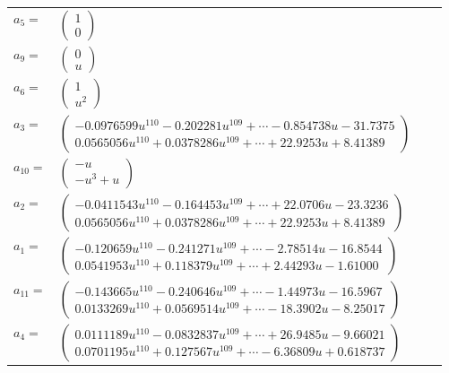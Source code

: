 \documentclass[1p]{elsarticle_modified}
\theoremstyle{definition}
\begin{document}
\begin{tabular}{m{7pt} m{180pt} m{7pt} m{180pt} }
\flushright $a_{5}=$&$\begin{pmatrix}1\\0\end{pmatrix}$ \\
\flushright $a_{9}=$&$\begin{pmatrix}0\\u\end{pmatrix}$ \\
\flushright $a_{6}=$&$\begin{pmatrix}1\\u^2\end{pmatrix}$ \\
\flushright $a_{3}=$&$\begin{pmatrix}-0.0976599 u^{110}-0.202281 u^{109}+\cdots-0.854738 u-31.7375\\0.0565056 u^{110}+0.0378286 u^{109}+\cdots+22.9253 u+8.41389\end{pmatrix}$ \\
\flushright $a_{10}=$&$\begin{pmatrix}- u\\- u^3+u\end{pmatrix}$ \\
\flushright $a_{2}=$&$\begin{pmatrix}-0.0411543 u^{110}-0.164453 u^{109}+\cdots+22.0706 u-23.3236\\0.0565056 u^{110}+0.0378286 u^{109}+\cdots+22.9253 u+8.41389\end{pmatrix}$ \\
\flushright $a_{1}=$&$\begin{pmatrix}-0.120659 u^{110}-0.241271 u^{109}+\cdots-2.78514 u-16.8544\\0.0541953 u^{110}+0.118379 u^{109}+\cdots+2.44293 u-1.61000\end{pmatrix}$ \\
\flushright $a_{11}=$&$\begin{pmatrix}-0.143665 u^{110}-0.240646 u^{109}+\cdots-1.44973 u-16.5967\\0.0133269 u^{110}+0.0569514 u^{109}+\cdots-18.3902 u-8.25017\end{pmatrix}$ \\
\flushright $a_{4}=$&$\begin{pmatrix}0.0111189 u^{110}-0.0832837 u^{109}+\cdots+26.9485 u-9.66021\\0.0701195 u^{110}+0.127567 u^{109}+\cdots-6.36809 u+0.618737\end{pmatrix}$ \\

\end{tabular}
\end{document}
